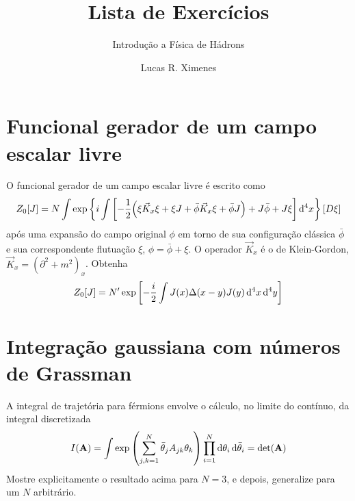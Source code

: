 \documentclass[a4paper, 11pt, oneside]{impression}
\title{Lista de Exercícios} %
\subtitle{Introdução a Física de Hádrons} %
\author{Lucas R. Ximenes} %
\begin{document}
\maketitle

\chapter{Funcional gerador de um campo escalar livre}\label{quest: one}

\begin{exercise}{}
    O funcional gerador de um campo escalar livre é escrito como
        \begin{equation*}
            Z_{0}[J] = N \int \exp\qty{
                i \int \qty[
                    -\dfrac{1}{2}\qty(
                        \xi\vec{K}_{x}\xi +
                        \xi J +
                        \bar{\phi}\vec{K}_{x}\xi + 
                        \bar{\phi}J
                    ) + 
                    J\bar{\phi} + 
                    J\xi
                ]\dd[4]{x}
            }[D\xi]
        \end{equation*}
    após uma expansão do campo original $\phi$ em torno de sua configuração clássica $\bar{\phi}$ e sua correspondente flutuação $\xi$, $\phi = \bar{\phi} + \xi$. O operador $\vec{K}_{x}$ é o de Klein-Gordon, $\vec{K}_{x} = (\partial^{2} + m^{2})_{x}$. Obtenha
        \begin{equation*}
            Z_{0}[J] = N'\exp\qty[
                -\dfrac{i}{2}\int J(x)\Delta(x-y)J(y)\dd[4]{x}\dd[4]{y}
            ]
        \end{equation*}
\end{exercise}



\chapter{Integração gaussiana com números de Grassman}\label{quest: two}

\begin{exercise}{}
    A integral de trajetória para férmions envolve o cálculo, no limite do contínuo, da integral discretizada
        \begin{equation*}
            I(\vb{A}) = \int \exp\qty(\sum_{j,k=1}^{N}\bar{\theta}_{j}A_{jk}\theta_{k})\prod_{i=1}^{N}\dd{\theta_{i}}\dd{\bar{\theta}_{i}} = \text{det}(\vb{A})
        \end{equation*}
    Mostre explicitamente o resultado acima para $N = 3$, e depois, generalize para um $N$ arbitrário.
\end{exercise}
\end{document}
